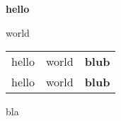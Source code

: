 \documentclass[ngerman]{letter}
\begin{document}
\begin{center}
  \bfseries hello
\end{center}
world

\begin{tabular}{c |c >{\bfseries}p{3cm}}
hello & world & blub\tabularnewline
hello & world & blub
\end{tabular}

bla
\end{document}

